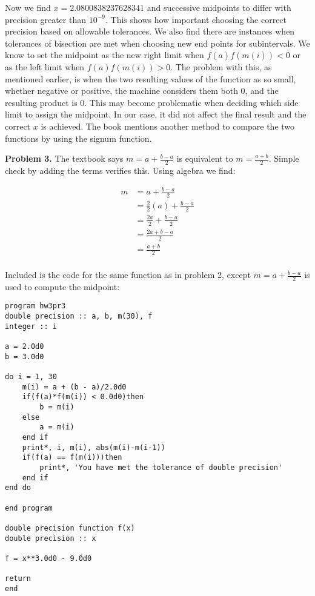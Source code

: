 \documentclass[12pt]{article}
\begin{document}
Now we find $x=2.0800838237628341$ and successive midpoints to differ with precision greater than $10^{-9}$. This shows how important choosing the correct precision based on allowable tolerances. We also find there are instances when tolerances of bisection are met when choosing new end points for subintervals. We know to set the midpoint as the new right limit when $f(a)f(m(i))<0$ or as the left limit when $f(a)f(m(i))>0$. The problem with this, as mentioned earlier, is when the two resulting values of the function as so small, whether negative or positive, the machine considers them both 0, and the resulting product is 0. This may become problematic when deciding which side limit to assign the midpoint. In our case, it did not affect the final result and the correct $x$ is achieved. The book mentions another method to compare the two functions by using the signum function.

\bigskip

\textbf{Problem 3.} The textbook says $m=a+\frac{b-a}{2}$ is equivalent to $m=\frac{a+b}{2}$. Simple check by adding the terms verifies this. Using algebra we find:

\begin{equation*}
\begin{align}
m &= a+\frac{b-a}{2}\\
&= \frac{2}{2}(a)+\frac{b-a}{2}\\
&= \frac{2a}{2}+\frac{b-a}{2}\\
&= \frac{2a+b-a}{2}\\
&= \frac{a+b}{2}\\
\end{align}
\end{equation*}

Included is the code for the same function as in problem 2, except $m=a+\frac{b-a}{2}$ is used to compute the midpoint:

\begin{verbatim}
program hw3pr3
double precision :: a, b, m(30), f
integer :: i 

a = 2.0d0
b = 3.0d0

do i = 1, 30 
	m(i) = a + (b - a)/2.0d0
	if(f(a)*f(m(i)) < 0.0d0)then
		b = m(i)
	else
		a = m(i)
	end if
	print*, i, m(i), abs(m(i)-m(i-1))
	if(f(a) == f(m(i)))then
		print*, 'You have met the tolerance of double precision'
	end if
end do

end program

double precision function f(x)
double precision :: x

f = x**3.0d0 - 9.0d0

return
end
\end{verbatim}
\end{document}
